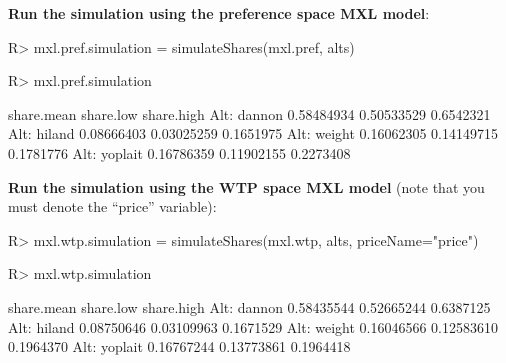 \documentclass[article]{jss}
\begin{document}
\textbf{Run the simulation using the preference space MXL model}:

\begin{CodeChunk}

\begin{CodeInput}
R> mxl.pref.simulation = simulateShares(mxl.pref, alts)
\end{CodeInput}
\end{CodeChunk}
\begin{CodeChunk}

\begin{CodeInput}
R> mxl.pref.simulation
\end{CodeInput}

\begin{CodeOutput}
             share.mean  share.low share.high
Alt: dannon  0.58484934 0.50533529  0.6542321
Alt: hiland  0.08666403 0.03025259  0.1651975
Alt: weight  0.16062305 0.14149715  0.1781776
Alt: yoplait 0.16786359 0.11902155  0.2273408
\end{CodeOutput}
\end{CodeChunk}

\textbf{Run the simulation using the WTP space MXL model} (note that you
must denote the ``price'' variable):

\begin{CodeChunk}

\begin{CodeInput}
R> mxl.wtp.simulation = simulateShares(mxl.wtp, alts, priceName="price")
\end{CodeInput}
\end{CodeChunk}
\begin{CodeChunk}

\begin{CodeInput}
R> mxl.wtp.simulation
\end{CodeInput}

\begin{CodeOutput}
             share.mean  share.low share.high
Alt: dannon  0.58435544 0.52665244  0.6387125
Alt: hiland  0.08750646 0.03109963  0.1671529
Alt: weight  0.16046566 0.12583610  0.1964370
Alt: yoplait 0.16767244 0.13773861  0.1964418
\end{CodeOutput}
\end{CodeChunk}


\end{document}
